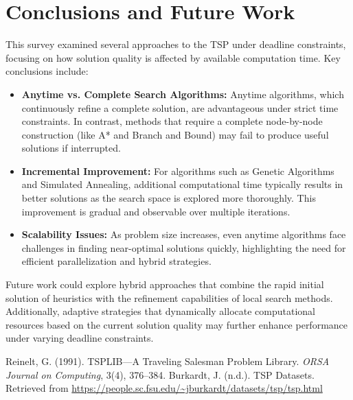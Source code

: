 \documentclass[11pt]{article}
\begin{document}
	\section{Conclusions and Future Work}
	This survey examined several approaches to the TSP under deadline constraints, focusing on how solution quality is affected by available computation time. Key conclusions include:
	\begin{itemize}[noitemsep]
		\item \textbf{Anytime vs. Complete Search Algorithms:} Anytime algorithms, which continuously refine a complete solution, are advantageous under strict time constraints. In contrast, methods that require a complete node-by-node construction (like A* and Branch and Bound) may fail to produce useful solutions if interrupted.
		\item \textbf{Incremental Improvement:} For algorithms such as Genetic Algorithms and Simulated Annealing, additional computational time typically results in better solutions as the search space is explored more thoroughly. This improvement is gradual and observable over multiple iterations.
		\item \textbf{Scalability Issues:} As problem size increases, even anytime algorithms face challenges in finding near-optimal solutions quickly, highlighting the need for efficient parallelization and hybrid strategies.
	\end{itemize}
	
	Future work could explore hybrid approaches that combine the rapid initial solution of heuristics with the refinement capabilities of local search methods. Additionally, adaptive strategies that dynamically allocate computational resources based on the current solution quality may further enhance performance under varying deadline constraints.
	
	\begin{thebibliography}{9}
		Reinelt, G. (1991). TSPLIB—A Traveling Salesman Problem Library. \emph{ORSA Journal on Computing}, 3(4), 376--384.
		Burkardt, J. (n.d.). TSP Datasets. Retrieved from \url{https://people.sc.fsu.edu/~jburkardt/datasets/tsp/tsp.html}
	\end{thebibliography}
	
\end{document}
